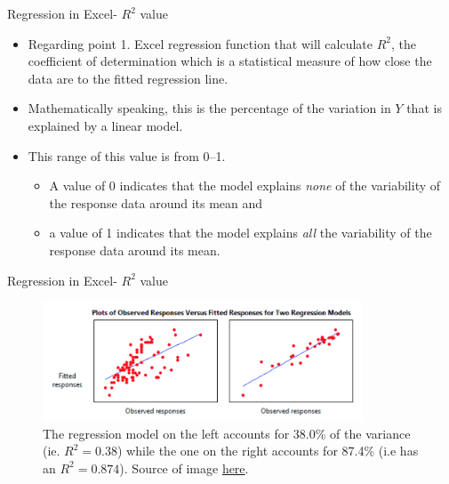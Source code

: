 \documentclass[xcolor=svgnames]{beamer}
\begin{document}
\begin{frame}[label=current]{Regression in Excel- $R^2$ value}
\begin{itemize}
\item Regarding point 1. Excel regression function that will calculate $R^2$, the coefficient of determination which is a statistical measure of how close the data are to the fitted regression line.
\medskip
\item Mathematically speaking, this is the percentage of the variation in $Y$ that is explained by a linear model. 
\medskip
\item This range of this value is from 0--1.
\begin{itemize} 
\item A value of 0 indicates that the model explains \textit{none} of the variability of the response data around its mean and 
\item a value of 1 indicates that the model explains \textit{all} the variability of the response data around its mean.
\end{itemize}
\end{itemize}
\end{frame}

\begin{frame}{Regression in Excel- $R^2$ value}
\begin{figure}[h]
\begin{center}
\includegraphics[width=0.85\textwidth]{img/rsquared.png}
\caption{The regression model on the left accounts for 38.0\% of the variance (ie. $R^2 = 0.38$) while the one on the right accounts for 87.4\% (i.e has an $R^2 = 0.874$). Source of image \href{https://blog.minitab.com/blog/adventures-in-statistics-2/regression-analysis-how-do-i-interpret-r-squared-and-assess-the-goodness-of-fit}{here}.}
\label{default}
\end{center}
\end{figure}

\end{frame}
\end{document}
